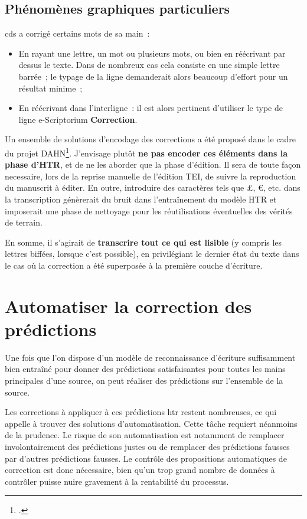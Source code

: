 \documentclass[a4paper,12pt,twoside]{book}
\begin{document}
	        \subsection{Phénomènes graphiques particuliers}
            \gls{cds} a corrigé certains mots de sa main~:
 
				\begin{itemize}
				 	\item En rayant une lettre, un mot ou plusieurs mots, ou bien en réécrivant par dessus le texte. Dans de nombreux cas cela consiste en une simple lettre barrée~; le typage de la ligne demanderait alors beaucoup d'effort pour un résultat minime~;
				 	\item En réécrivant dans l'interligne~: il est alors pertinent d'utiliser le type de ligne e-Scriptorium \textbf{Correction}.
				\end{itemize}
			
			Un ensemble de solutions d'encodage des corrections a été proposé dans le cadre du projet DAHN\footcite{chiffoleauFewTipsReading}. J'envisage plutôt \textbf{ne pas encoder ces éléments dans la phase d'HTR}, et de ne les aborder que la phase d'édition. Il sera de toute façon necessaire, lors de la reprise manuelle de l'édition TEI, de suivre la reproduction du manuscrit à éditer. En outre, introduire des caractères tels que £, €, etc. dans la transcription génèrerait du bruit dans l'entraînement du modèle HTR et imposerait une phase de nettoyage pour les réutilisations éventuelles des vérités de terrain.
			
			En somme, il s'agirait de \textbf{transcrire tout ce qui est lisible} (y compris les lettres biffées, lorsque c'est possible), en privilégiant le dernier état du texte dans le cas où la correction a été superposée à la première couche d'écriture.
			
		\section{Automatiser la correction des prédictions}
			Une fois que l'on dispose d'un modèle de reconnaissance d'écriture suffisamment bien entraîné pour donner des prédictions satisfaisantes pour toutes les mains principales d'une source, on peut réaliser des prédictions sur l'ensemble de la source.
			
			Les corrections à appliquer à ces prédictions \gls{htr} restent nombreuses, ce qui appelle à trouver des solutions d'automatisation. Cette tâche requiert néanmoins de la prudence. Le risque de son automatisation est notamment de remplacer involontairement des prédictions justes ou de remplacer des prédictions fausses par d'autres prédictions fausses. Le contrôle des propositions automatiques de correction est donc nécessaire, bien qu'un trop grand nombre de données à contrôler puisse nuire gravement à la rentabilité du processus.
			
\end{document}
